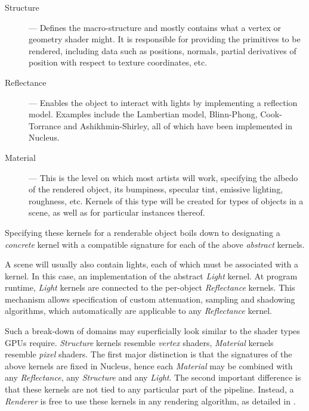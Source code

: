 \begin{description}
\item[Structure] --- Defines the macro-structure and mostly contains what a vertex or geometry shader might. It is responsible for providing the primitives to be rendered, including data such as positions, normals, partial derivatives of position with respect to texture coordinates, etc.

\item[Reflectance] --- Enables the object to interact with lights by implementing a reflection model. Examples include the Lambertian model, Blinn-Phong, Cook-Torrance and Ashikhmin-Shirley, all of which have been implemented in Nucleus.

\item[Material] --- This is the level on which most artists will work, specifying the albedo of the rendered object, its bumpiness, specular tint, emissive lighting, roughness, etc. Kernels of this type will be created for types of objects in a scene, as well as for particular instances thereof.
\end{description}

Specifying these kernels for a renderable object boils down to designating a \emph{concrete} kernel with a compatible signature for each of the above \emph{abstract} kernels.

A scene will usually also contain lights, each of which must be associated with a kernel. In this case, an implementation of the abstract \emph{Light} kernel. At program runtime, \emph{Light} kernels are connected to the per-object \emph{Reflectance} kernels. This mechanism allows specification of custom attenuation, sampling and shadowing algorithms, which automatically are applicable to any \emph{Reflectance} kernel.


Such a break-down of domains may superficially look similar to the shader types GPUs require. \emph{Structure} kernels resemble \emph{vertex} shaders, \emph{Material} kernels resemble \emph{pixel} shaders. The first major distinction is that the signatures of the above kernels are fixed in Nucleus, hence each \emph{Material} may be combined with any \emph{Reflectance}, any \emph{Structure} and any \emph{Light}. The second important difference is that these kernels are not tied to any particular part of the pipeline. Instead, a \emph{Renderer} is free to use these kernels in any rendering algorithm, as detailed in .

